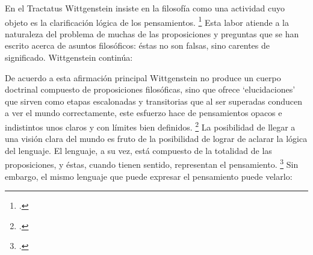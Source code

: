 

En el Tractatus Wittgenstein insiste en
la filosofía como una actividad cuyo objeto es la clarificación lógica de los
pensamientos. \footcite[4.112 p. 52]{tractatus} Esta labor atiende a la
naturaleza del problema de muchas de las proposiciones y preguntas que se han
escrito acerca de asuntos filosóficos: éstas no son falsas, sino carentes de
significado. Wittgenstein continúa: 



De acuerdo a esta afirmación principal Wittgenstein no produce un cuerpo
doctrinal compuesto de proposiciones filosóficas, sino que ofrece
`elucidaciones' que sirven como etapas escalonadas y transitorias que al ser
superadas conducen a ver el mundo correctamente, este esfuerzo hace de
pensamientos opacos e indistintos unos claros y con límites bien definidos.
\footcite[cf. 4.112 y 6.54]{tractatus} La posibilidad de llegar a una visión
clara del mundo es fruto de la posibilidad de lograr de aclarar la lógica del
lenguaje. El lenguaje, a su vez, está compuesto de la totalidad de las
proposiciones, y éstas, cuando tienen sentido, representan el pensamiento.
\footcite[cf. 4 y 4.001]{tractatus} Sin embargo, el mismo lenguaje que puede
expresar el pensamiento puede velarlo:



